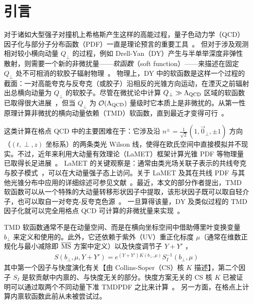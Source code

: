 \section{引言}

对于诸如大型强子对撞机上希格斯产生这样的高能过程，量子色动力学（QCD）因子化与部分子分布函数（PDF）一直是理论预言的重要工具~\cite{Ellis:1991qj,Lin:2017snn}。
%
但对于涉及观测相对较小横向动量 $Q_\perp$ 的过程，例如 Drell-Yan（DY）产生与半单举深度非弹性散射，则需要一个新的非微扰量——{\it 软函数}（soft function）——来描述在固定 $Q_\perp$ 处不可相消的软胶子辐射物理~\cite{Collins:1981uk,Collins:1984kg,Ji:2004wu,Ji:2004xq}。
%
物理上，DY 中的软函数是这样一个过程的截面：一对高能夸克与反夸克（或胶子）沿相反的光锥方向运动，在湮灭之前辐射出总横向动量为 $Q_\perp$ 的软胶子。尽管在微扰论中计算 $Q_\perp\gg \Lambda_{\rm QCD}$ 区域的软函数已取得很大进展~\cite{Echevarria:2015byo,Li:2016ctv}，但当 $Q_\perp$ 为 ${\cal O}(\Lambda_{\rm QCD})$ 量级时它本质上是非微扰的。从第一性原理计算非微扰的横向动量依赖（TMD）软函数，直到最近才变得可行~\cite{Ji:2019sxk}。


这类计算在格点 QCD 中的主要困难在于：它涉及沿 $n^\pm=\frac{1}{\sqrt 2}(1,\vec 0_\perp,\pm 1)$ 方向（$(t,\perp,z)$ 坐标系）的两条类光 Wilson 线，使得在欧氏空间中直接模拟并不现实。不过，近年来利用大动量有效理论（LaMET）框架计算光锥 PDF 等物理量已取得长足进展~\cite{Ji:2013dva,Ji:2014gla}。
LaMET 的关键观察是：通常由类光场关联子表示的共线夸克与胶子模式~\cite{Collins:2011zzd,Bauer:2000yr,Bauer:2001ct,Bauer:2001yt}，可以在大动量强子态上访问。关于 LaMET 及其在共线 PDF 与其他光锥分布中应用的详细综述可参见文献~\cite{Ji:2020ect,Cichy:2018mum}。最近，本文的部分作者提出，TMD 软函数可以从一个特殊的大动量转移形状因子中提取，该形状因子既可以取自轻介子，也可以取自一对夸克-反夸克色源~\cite{Ji:2019sxk}。
一旦算得该量，DY 及类似过程的 TMD 因子化就可以完全用格点 QCD 可计算的非微扰量来实现~\cite{Ji:2014hxa,Ji:2018hvs,Ebert:2018gzl,Ebert:2019okf,Ji:2019ewn,Vladimirov:2020ofp}。


TMD 软函数通常不是在动量空间、而是在横向坐标空间中借助傅里叶变换变量 $b_\perp $ 来定义和使用的。此外，它还依赖于紫外（UV）重正化标度 $\mu$（通常在维数正规化与最小减除即 $\overline{\rm MS}$ 方案中定义）以及快度调节子 $Y+Y'$
\cite{Collins:2011zzd,Ji:2019sxk}，
\begin{align}
S(b_\perp,\mu,Y+Y')=e^{(Y+Y')K(b_\perp,\mu)}S_I^{-1}(b_\perp, \mu)
\end{align}
其中第一个因子与快度演化有关【由 Collins-Soper（CS）核 $K$ 描述】，第二个因子 $S_I$ 是软贡献中内禀的、与快度无关的部分。快度方案无关的 CS 核 $K$ 已被证明可以通过取两个不同动量下准 TMDPDF 之比来计算~\cite{Ebert:2018gzl,Ebert:2019okf,Ji:2019ewn,Vladimirov:2020ofp,Ebert:2019tvc,Shanahan:2020zxr}。
另一方面，在格点上计算内禀软函数此前从未被尝试过。

